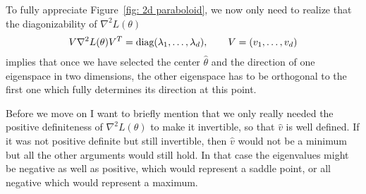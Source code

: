 %
To fully appreciate Figure~\ref{fig: 2d paraboloid}, we now only need to realize
that the diagonizability of \(\nabla^2 L(\theta)\)
%
\begin{align}\label{eq: diagnalization of the Hesse matrix}
	V \nabla^2 L(\theta) V^T
	= \text{diag}(\lambda_1,\dots,\lambda_d), \qquad V=(v_1,\dots, v_d)
\end{align}
%
implies that once we have selected the center \(\hat{\theta}\) and the direction of
one eigenspace in two dimensions, the other eigenspace has to be
orthogonal to the first one which fully determines its direction at this point. 

Before we move on I want to briefly mention that we only really needed the
positive definiteness of \(\nabla^2 L(\theta)\) to make it invertible, so that
\(\hat{v}\) is well defined. If it was not positive definite but still invertible,
then \(\hat{v}\) would not be a minimum but all the other arguments would still
hold.
In that case the eigenvalues might be negative as well as positive, which would
represent a saddle point, or all negative which would represent a maximum.

